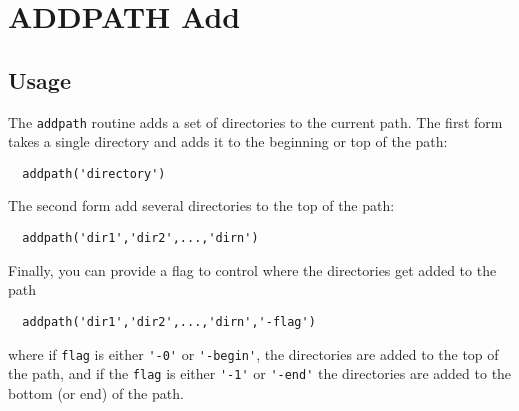 \section{ADDPATH Add }

\subsection{Usage}

The \verb|addpath| routine adds a set of directories to the current path.
The first form takes a single directory and adds it to the beginning
or top of the path:
\begin{verbatim}
  addpath('directory')
\end{verbatim}
The second form add several directories to the top of the path:
\begin{verbatim}
  addpath('dir1','dir2',...,'dirn')
\end{verbatim}
Finally, you can provide a flag to control where the directories get
added to the path
\begin{verbatim}
  addpath('dir1','dir2',...,'dirn','-flag')
\end{verbatim}
where if \verb|flag| is either \verb|'-0'| or \verb|'-begin'|, the directories are
added to the top of the path, and if the \verb|flag| is either \verb|'-1'| or 
\verb|'-end'| the directories are added to the bottom (or end) of the path.
